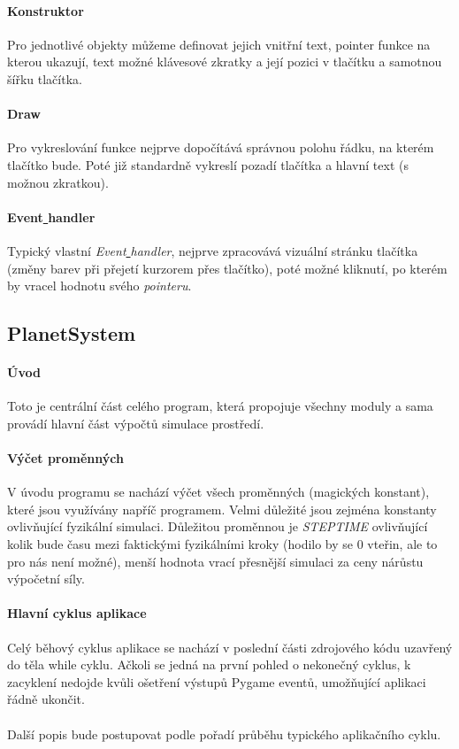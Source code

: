 \documentclass[a4paper, 12pt]{article}
\begin{document}
\paragraph{Konstruktor}
Pro jednotlivé objekty můžeme definovat jejich vnitřní text, pointer funkce na
kterou ukazují, text možné klávesové zkratky a její pozici v tlačítku a
samotnou šířku tlačítka.

\paragraph{Draw}
Pro vykreslování funkce nejprve dopočítává správnou polohu řádku, na kterém
tlačítko bude. Poté již standardně vykreslí pozadí tlačítka a hlavní text (s
možnou zkratkou).

\paragraph{Event\underline{ }handler}
Typický vlastní \emph{Event\underline{ }handler}, nejprve zpracovává vizuální
stránku tlačítka (změny barev při přejetí kurzorem přes tlačítko), poté možné
kliknutí, po kterém by vracel hodnotu svého \emph{pointeru}.

\subsection{PlanetSystem} 
\paragraph{Úvod}
Toto je centrální část celého program, která propojuje všechny moduly a sama
provádí hlavní část výpočtů simulace prostředí. 

\paragraph{Výčet proměnných} 
V úvodu programu se nachází výčet všech proměnných (magických konstant), které
jsou využívány napříč programem. Velmi důležité jsou zejména konstanty
ovlivňující fyzikální simulaci. Důležitou proměnnou je \emph{STEPTIME}
ovlivňující kolik bude času mezi faktickými fyzikálními kroky (hodilo by se 0
vteřin, ale to pro nás není možné), menší hodnota vrací přesnější simulaci za
ceny nárůstu výpočetní síly. 

\paragraph{Hlavní cyklus aplikace} Celý běhový cyklus aplikace se nachází v
poslední části zdrojového kódu uzavřený do těla while cyklu. Ačkoli se jedná
na první pohled o nekonečný cyklus, k zacyklení nedojde kvůli ošetření
výstupů Pygame eventů, umožňující aplikaci řádně ukončit.
\\\\
Další popis bude postupovat podle pořadí průběhu typického aplikačního cyklu.
\end{document}
